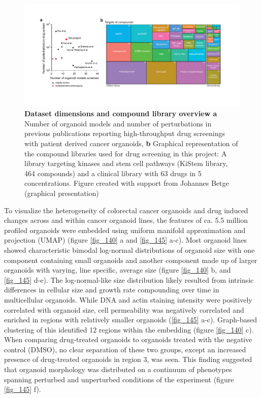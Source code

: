 \begin{flushleft}
\begin{figure}[h]
\centering
\includegraphics[width=\textwidth,
                height=\textheight,
                keepaspectratio]{figures/pdf/fig_137.pdf}
\caption{\textbf{Dataset dimensions and compound library overview a} Number of organoid models and number of perturbations in previous publications reporting high-throughput drug screenings with patient derived cancer organoids, \textbf{b} Graphical representation of the compound libraries used for drug screening in this project: A library targeting kinases and stem cell pathways (KiStem library, 464 compounds) and a clinical library with 63 drugs in 5 concentrations. Figure created with support from Johannes Betge (graphical presentation)}
\label{fig_137}
\end{figure}

\bigbreak

To visualize the heterogeneity of colorectal cancer organoids and drug induced changes across and within cancer organoid lines, the features of ca. 5.5 million profiled organoids were embedded using uniform manifold approximation and projection (UMAP) (figure \ref{fig_140} a and \ref{fig_145} a-c). Most organoid lines showed characteristic bimodal log-normal distributions of organoid size with one component containing small organoids and another component made up of larger organoids with varying, line specific, average size (figure \ref{fig_140} b, and \ref{fig_145} d-e). The log-normal-like size distribution likely resulted from intrinsic differences in cellular size and growth rate compounding over time in multicellular organoids. While DNA and actin staining intensity were positively correlated with organoid size, cell permeability was negatively correlated and enriched in regions with relatively smaller organoids (\ref{fig_145} a-c). Graph-based clustering of this identified 12 regions within the embedding (figure \ref{fig_140} c). When comparing drug-treated organoids to organoids treated with the negative control (DMSO), no clear separation of these two groups, except an increased presence of drug-treated organoids in region 3,  was seen. This finding suggested that organoid morphology was distributed on a continuum of phenotypes spanning perturbed and unperturbed conditions of the experiment (figure \ref{fig_145} f). 


\end{flushleft}
